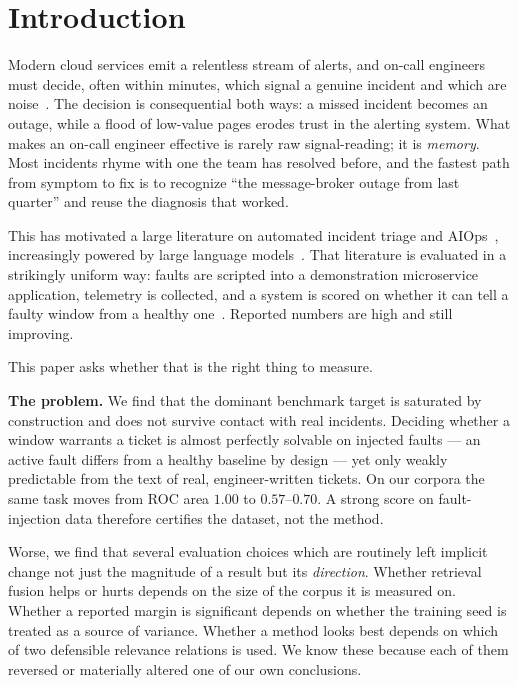 \section{Introduction}
\label{sec:introduction}

Modern cloud services emit a relentless stream of alerts, and on-call engineers
must decide, often within minutes, which signal a genuine incident and which are
noise~\cite{he2021survey,ghosh2022incidents}. The decision is consequential both
ways: a missed incident becomes an outage, while a flood of low-value pages
erodes trust in the alerting system. What makes an on-call engineer effective is
rarely raw signal-reading; it is \emph{memory}. Most incidents rhyme with one the
team has resolved before, and the fastest path from symptom to fix is to
recognize ``the message-broker outage from last quarter'' and reuse the
diagnosis that worked.

This has motivated a large literature on automated incident triage and
AIOps~\cite{he2021survey,chen2019triage,ghosh2022incidents}, increasingly powered
by large language models~\cite{ahmed2023rootcause,chen2024rcacopilot}. That
literature is evaluated in a strikingly uniform way: faults are scripted into a
demonstration microservice application, telemetry is collected, and a system is
scored on whether it can tell a faulty window from a healthy
one~\cite{chen2025aiopslab}. Reported numbers are high and still improving.

This paper asks whether that is the right thing to measure.

\smallskip
\noindent\textbf{The problem.} We find that the dominant benchmark target is
saturated by construction and does not survive contact with real incidents.
Deciding whether a window warrants a ticket is almost perfectly solvable on
injected faults --- an active fault differs from a healthy baseline by
design --- yet only weakly predictable from the text of real, engineer-written
tickets. On our corpora the same task moves from ROC area $1.00$ to
$0.57$--$0.70$. A strong score on fault-injection data therefore certifies the
dataset, not the method.

Worse, we find that several evaluation choices which are routinely left
implicit change not just the magnitude of a result but its \emph{direction}.
Whether retrieval fusion helps or hurts depends on the size of the corpus it is
measured on. Whether a reported margin is significant depends on whether the
training seed is treated as a source of variance. Whether a method looks best
depends on which of two defensible relevance relations is used. We know these
because each of them reversed or materially altered one of our own conclusions.

